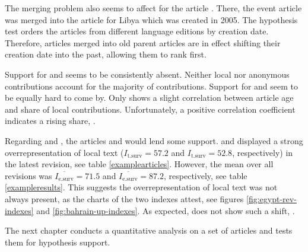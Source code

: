 The merging problem also seems to affect  for the article .
There, the event article was merged into the article for Libya which was created in 2005.
The hypothesis test orders the articles from different language editions by creation date.
Therefore, articles merged into old parent articles are in effect shifting their creation date into the past, allowing them to rank first.

Support for  and   seems to be consistently absent.
Neither local nor anonymous contributions account for the majority of contributions.
Support for  and   seem to be equally hard to come by.
Only  shows a slight correlation between article age and share of local contributions.
Unfortunately, a positive correlation coefficient indicates a rising share, .


Regarding  and , the articles   and  would lend some support.
 and  displayed a strong overrepresentation of local text ($I_{\text{t.surv}} = 57.2$ and $I_{\text{t.surv}} = 52.8$, respectively) in the latest revision, see table \ref{examplearticles}.
However, the mean over all revisions was $\overline{I_{\text{e.surv}}} = 71.5$ and $\overline{I_{\text{e.surv}}} = 87.2$, respectively,  see table \ref{exampleresults}.
This suggests the overrepresentation of local text was not always present, as the charts of the two indexes attest, see figures \ref{fig:egypt-rev-indexes} and \ref{fig:bahrain-up-indexes}.
As expected,  does not show such a shift, .


The next chapter  conducts a quantitative analysis on a set of articles and tests them for hypothesis support.

 
